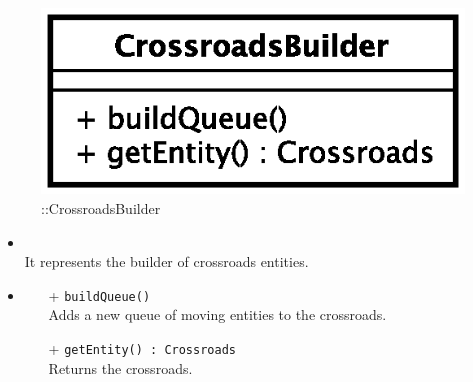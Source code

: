 \begin{figure}[h]
\centering
\includegraphics[scale=0.6,keepaspectratio]{images/solution/crossroads_builder.eps}
\caption{\pReactiveBuild::CrossroadsBuilder}
\label{fig:sd-app-crossroads_builder}
\end{figure}
\FloatBarrier
\begin{itemize}
  \item \textbf{\descr} \\
    It represents the builder of crossroads entities. 
  \item \textbf{\ops}
  \begin{itemize} 
    \item[+] \texttt{buildQueue()} \\
Adds a new queue of moving entities to the crossroads.
    \item[+] \texttt{getEntity() : Crossroads} \\
Returns the crossroads.
  \end{itemize}
\end{itemize}
